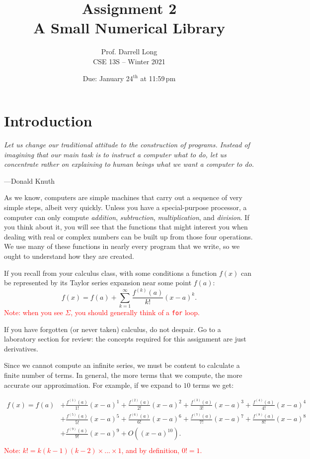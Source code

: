 \documentclass[11pt]{article}
\title{Assignment 2 \\ A Small Numerical Library}
\author{
  Prof. Darrell Long \\
  CSE 13S -- Winter 2021
}
\date{Due: January 24$^\text{th}$ at 11:59\,pm}
\newcommand{\taylorterm}[1]{\frac{f^{(#1)} (a)}{#1!}{(x-a)}^{#1}}
\begin{document}
\maketitle

\section{Introduction}

\textwidth
\epigraph{\emph{Let us change our traditional attitude to the construction of
programs. Instead of imagining that our main task is to instruct a computer what
to do, let us concentrate rather on explaining to human beings what we want a
computer to do.}} {---Donald Knuth}

\noindent As we know, computers are simple machines that carry out a sequence of
very simple steps, albeit very quickly. Unless you have a special-purpose
processor, a computer can only compute \emph{addition}, \emph{subtraction},
\emph{multiplication}, and \emph{division}. If you think about it, you will see
that the functions that might interest you when dealing with real or complex
numbers can be built up from those four operations.  We use many of these
functions in nearly every program that we write, so we ought to understand how
they are created.

If you recall from your calculus class, with some conditions a function $f(x)$
can be represented by its Taylor series expansion near some point $f(a)$:
\[
  f(x) = f(a) + \sum_{k=1}^\infty \frac{f^{(k)}(a)}{k!}{(x-a)}^k.
\]
\textcolor{red}{Note: when you see $\Sigma$, you should generally think of a
\texttt{for} loop.}

If you have forgotten (or never taken) calculus, do not despair. Go to a
laboratory section for review: the concepts required for this assignment are
just derivatives.

Since we cannot compute an infinite series, we must be content to calculate a
finite number of terms. In general, the more terms that we compute, the more
accurate our approximation. For example, if we expand to $10$ terms we get:

\begin{align*}
  f(x) = f(a) &+ \taylorterm{1} + \taylorterm{2} + \taylorterm{3} + \taylorterm{4} \\
              &+ \taylorterm{5} + \taylorterm{6} + \taylorterm{7} + \taylorterm{8} \\
              &+ \taylorterm{9} + O({(x-a)}^{10}). \\
\end{align*}
\textcolor{red}{Note: $k! = k(k-1)(k-2)\times...\times1$, and by definition, $0! = 1$. }
\end{document}
